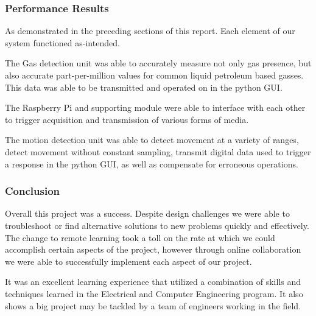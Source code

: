 \subsubsection{Performance Results}
	As demonstrated in the preceding sections of this report. Each element of our system functioned as-intended.
	\par The Gas detection unit was able to accurately measure not only gas presence, but also accurate part-per-million values for common liquid petroleum based gasses. This data was able to be transmitted and operated on in the python GUI.
	\par The Raspberry Pi and supporting module were able to interface with each other to trigger acquisition and transmission of various forms of media.
	\par The motion detection unit was able to detect movement at a variety of ranges, detect movement without constant sampling, transmit digital data used to trigger a response in the python GUI, as well as compensate for erroneous operations.
	\subsubsection{Conclusion}
	Overall this project was a success. Despite design challenges we were able to troubleshoot or find alternative solutions to new problems quickly and effectively. The change to remote learning took a toll on the rate at which we could accomplish certain aspects of the project, however through online collaboration we were able to successfully implement each aspect of our project. 
	\par It was an excellent learning experience that utilized a combination of skills and techniques learned in the Electrical and Computer Engineering program. It also shows a big project may be tackled by a team of engineers working in the field. 
	